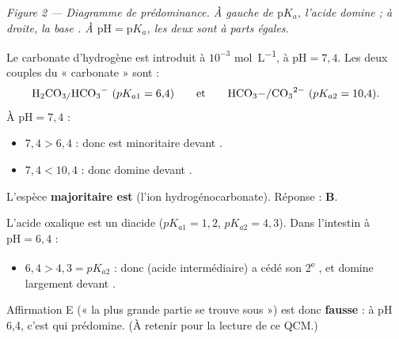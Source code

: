 \documentclass[11pt,a4paper]{article}
\begin{document}
\begin{center}
\end{center}
{\small\textit{Figure 2 --- Diagramme de prédominance. À gauche de $\mathrm{p}K_a$, l'acide  domine ;
à droite, la base . À $\mathrm{pH}=\mathrm{p}K_a$, les deux sont à parts égales.}}

\begin{exemple}
Le carbonate d'hydrogène est introduit à $10^{-3}$ \si{mol.L^{-1}}, à $\mathrm{pH} = 7{,}4$. Les deux couples
du « carbonate » sont :
\[ \ce{H2CO3/HCO3-}\ (pK_{a1}=6{,}4) \qquad\text{et}\qquad \ce{HCO3-/CO3^{2-}}\ (pK_{a2}=10{,}4). \]
À $\mathrm{pH}=7{,}4$ :
\begin{itemize}[leftmargin=1.6em,topsep=2pt,itemsep=2pt]
  \item $7{,}4 > 6{,}4$ : donc  est minoritaire devant .
  \item $7{,}4 < 10{,}4$ : donc  domine devant .
\end{itemize}
L'espèce \textbf{majoritaire est } (l'ion hydrogénocarbonate). Réponse : \textbf{B}.
\end{exemple}

\begin{exemple}
L'acide oxalique  est un diacide ($pK_{a1}=1{,}2$, $pK_{a2}=4{,}3$). Dans l'intestin à
$\mathrm{pH}=6{,}4$ :
\begin{itemize}[leftmargin=1.6em,topsep=2pt,itemsep=2pt]
  \item $6{,}4 > 4{,}3 = pK_{a2}$ : donc  (acide intermédiaire) a cédé son 2\textsuperscript{e}
        , et  domine largement devant .
\end{itemize}
Affirmation E (« la plus grande partie se trouve sous  ») est donc \textbf{fausse} : à pH 6,4, c'est
 qui prédomine. (À retenir pour la lecture de ce QCM.)
\end{exemple}
\end{document}
